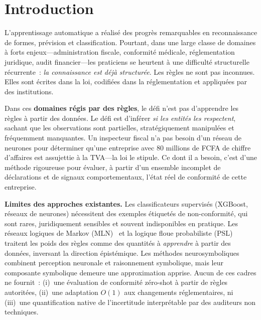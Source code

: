 \documentclass[letterpaper]{article}
\begin{document}
\newpage

\section{Introduction}
\label{sec:intro}

L'apprentissage automatique a r\'ealis\'e des progr\`es remarquables
en reconnaissance de formes, pr\'evision et classification. Pourtant,
dans une large classe de domaines \`a forts enjeux---administration
fiscale, conformit\'e m\'edicale, r\'eglementation juridique, audit
financier---les praticiens se heurtent \`a une difficult\'e structurelle
r\'ecurrente~: \emph{la connaissance est d\'ej\`a structur\'ee}. Les
r\`egles ne sont pas inconnues. Elles sont \'ecrites dans la loi, codifi\'ees
dans la r\'eglementation et appliqu\'ees par des institutions.

Dans ces \textbf{domaines r\'egis par des r\`egles}, le d\'efi n'est pas
d'apprendre les r\`egles \`a partir des donn\'ees. Le d\'efi est d'inf\'erer
\emph{si les entit\'es les respectent}, sachant que les observations sont
partielles, strat\'egiquement manipul\'ees et fr\'equemment manquantes.
Un inspecteur fiscal n'a pas besoin d'un r\'eseau de neurones pour
d\'eterminer qu'une entreprise avec 80 millions de FCFA de chiffre
d'affaires est assujettie \`a la TVA---la loi le stipule. Ce dont il a
besoin, c'est d'une m\'ethode rigoureuse pour \'evaluer, \`a partir d'un
ensemble incomplet de d\'eclarations et de signaux comportementaux,
l'\'etat r\'eel de conformit\'e de cette entreprise.

\medskip
\noindent\textbf{Limites des approches existantes.}
Les classificateurs supervis\'es (XGBoost, r\'eseaux de neurones)
n\'ecessitent des exemples \'etiquet\'es de non-conformit\'e, qui sont
rares, juridiquement sensibles et souvent indisponibles en pratique.
Les r\'eseaux logiques de Markov (MLN)~\citep{richardson2006markov} et
la logique floue probabiliste (PSL)~\citep{bach2017hinge} traitent les
poids des r\`egles comme des quantit\'es \`a \emph{apprendre} \`a partir
des donn\'ees, inversant la direction \'epist\'emique. Les m\'ethodes
neurosymboliques~\citep{garcez2022neural} combinent perception neuronale
et raisonnement symbolique, mais leur composante symbolique demeure une
approximation apprise. Aucun de ces cadres ne fournit~: (i)~une
\'evaluation de conformit\'e z\'ero-shot \`a partir de r\`egles autorit\'ees,
(ii)~une adaptation $O(1)$ aux changements r\'eglementaires, ni
(iii)~une quantification native de l'incertitude interpr\'etable par
des auditeurs non techniques.
\end{document}
